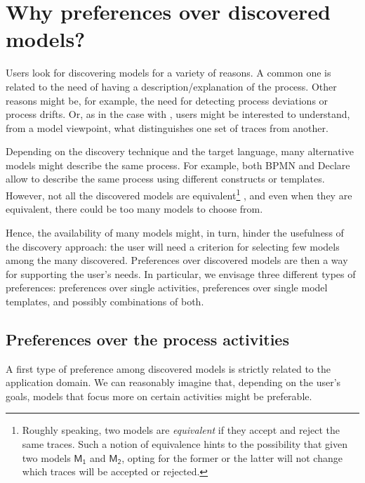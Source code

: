 
\section{Why preferences over discovered models?}
\label{sec:example}


Users look for discovering models for a variety of reasons. A common one is related to the need of having a description/explanation of the process. Other reasons might be, for example, the need for detecting process deviations or process drifts. Or, as in the case with \nd, users might be interested to understand, from a model viewpoint, what distinguishes one set of traces from another. 

Depending on the discovery technique and the target language, many alternative models might describe the same process. For example, both BPMN and Declare allow to describe the same process using different constructs or templates. However, not all the discovered models are equivalent\footnote{Roughly speaking, two models are \emph{equivalent} if they accept and reject the same traces. Such a notion of equivalence hints to the possibility that given two models $\mathsf{M_1}$ and $\mathsf{M_2}$, opting for the former or the latter will not change which traces will be accepted or rejected.}
, and even when they are equivalent, there could be too many models to choose from.

Hence, the availability of many models might, in turn, hinder the usefulness of the discovery approach: the user will need a criterion for selecting few models among the many discovered.
%
Preferences over discovered models are then a way for supporting the user's needs. In particular, we envisage three different types of preferences: preferences over single activities, preferences over single model templates, and possibly combinations of both.



\subsection{Preferences over the process activities}
\label{subsec:prefOverActivities}

A first type of preference among discovered models is strictly related to the application domain. We can reasonably imagine that, depending on the user's goals, models that focus more on certain activities might be preferable.

